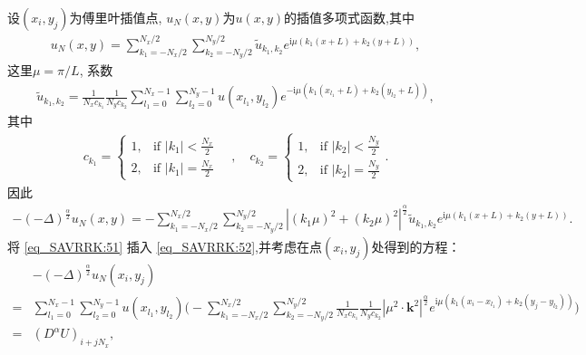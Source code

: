 设$\left(x_{i}, y_{j}\right)$为傅里叶插值点, $u_{N}(x, y)$为$u(x, y)$的插值多项式函数,其中
\begin{align}\label{eq_SAVRRK:50}
u_{N}(x, y)=\sum_{k_{1}=-N_{x} / 2}^{N_{x} / 2} \sum_{k_{2}=-N_{y} / 2}^{N_{y} / 2} \tilde{u}_{k_{1}, k_{2}} e^{\mathrm{i}\mu\left( k_{1} (x+L)+k_{2}(y+L)\right)},
\end{align}
这里$\mu={\pi}/{L}$, 系数
\begin{align}\label{eq_SAVRRK:51}
\tilde{u}_{k_{1}, k_{2}}=\frac{1}{N_{x} c_{k_{1}}} \frac{1}{N_{y} c_{k_{2}}} \sum_{l_1=0}^{N_{x}-1} \sum_{l_2=0}^{N_{y}-1} u(x_{l_1}, y_{l_2}) e^{-\mathrm{i}\mu\left( k_{1}(x_{l_1}+L)+k_{2}(y_{l_2}+L)\right)},
\end{align}
其中
\begin{align}c_{k_1} = \begin{cases} 1, & \text{if } |k_1| < \frac{N_x}{2} \\ 2, & \text{if } |k_1| = \frac{N_x}{2} \end{cases} \quad , \quad c_{k_2} = \begin{cases} 1, & \text{if } |k_2| < \frac{N_y}{2} \\ 2, & \text{if } |k_2| = \frac{N_y}{2} \end{cases}.\end{align}
因此
\begin{align}\label{eq_SAVRRK:52}
-(-\Delta)^{\frac{\alpha}{2}} u_{N}\left(x, y\right)=-\sum\limits_{k_{1}=-N_{x} / 2}^{N_{x} / 2} \sum\limits_{k_{2}=-N_{y} / 2}^{N_{y} / 2}\left|\left(k_{1} \mu\right)^{2}+\left(k_{2} \mu\right)^{2}\right|^{\frac{\alpha}{2}} \tilde{u}_{k_{1}, k_{2}} e^{\mathrm{i}\mu\left( k_{1} (x+L)+k_{2}(y+L)\right)}.
\end{align}
将 \eqref{eq_SAVRRK:51} 插入 \eqref{eq_SAVRRK:52},并考虑在点$(x_i,y_j)$处得到的方程：
\begin{align}
&-(-\Delta)^{\frac{\alpha}{2}} u_{N}\left(x_{i}, y_{j}\right)\nonumber\\
=&\sum\limits_{l_{1}=0}^{N_{x}-1} \sum\limits_{l_{2}=0}^{N_{y}-1}u(x_{l_{1}}, y_{l_{2}})\Big(-\sum\limits_{k_{1}=-N_{x} / 2}^{N_{x} / 2} \sum\limits_{k_{2}=-N_{y} / 2}^{N_{y} / 2} \frac{1}{N_{x} c_{k_{1}}} \frac{1}{N_{y} c_{k_{2}}}\left|\mu^{2} \cdot \mathbf{k}^{2}\right|^{\frac{\alpha}{2}} e^{\mathrm{i} \mu\left(k_{1}\left(x_{i}-x_{l_{1}}\right)+k_{2}\left(y_{j}-y_{l_{2}}\right)\right)}\Big)\nonumber\\
=&\left(D^{\alpha}U\right)_{i+j N_{x}},\label{eq_SAVRRK:53}
\end{align}

